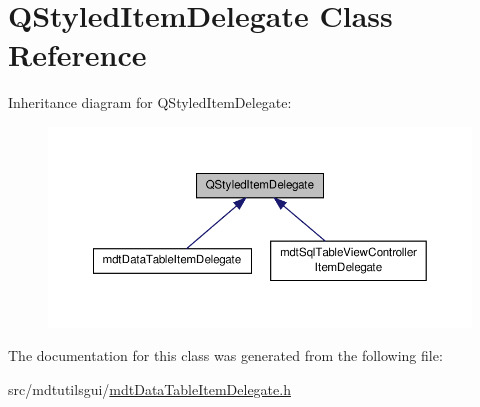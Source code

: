 \hypertarget{class_q_styled_item_delegate}{\section{Q\-Styled\-Item\-Delegate Class Reference}
\label{class_q_styled_item_delegate}
}


Inheritance diagram for Q\-Styled\-Item\-Delegate\-:\nopagebreak
\begin{figure}[H]
\begin{center}
\leavevmode
\includegraphics[width=350pt]{class_q_styled_item_delegate__inherit__graph}
\end{center}
\end{figure}


The documentation for this class was generated from the following file\-:\begin{DoxyCompactItemize}
\item 
src/mdtutilsgui/\hyperlink{mdt_data_table_item_delegate_8h}{mdt\-Data\-Table\-Item\-Delegate.\-h}\end{DoxyCompactItemize}
